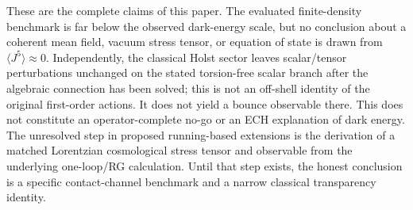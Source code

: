 \documentclass[aps,prd,twocolumn,superscriptaddress,preprintnumbers,nofootinbib,longbibliography,floatfix]{revtex4-2}
\begin{document}
These are the complete claims of this paper.  The evaluated finite-density
benchmark is far below the observed dark-energy scale, but no conclusion about
a coherent mean field, vacuum stress tensor, or equation of state is drawn
from $\langle J^5\rangle\approx0$.  Independently, the classical Holst sector
leaves scalar/tensor perturbations unchanged on the stated torsion-free scalar
branch after the algebraic connection has been solved; this is not an off-shell
identity of the original first-order actions.  It does not yield a bounce
observable there.  This does not constitute
an operator-complete no-go or an ECH explanation of dark energy.  The unresolved
step in proposed running-based extensions is the derivation of a matched
Lorentzian cosmological stress tensor and observable from the underlying
one-loop/RG calculation.  Until that step exists, the honest conclusion is a
specific contact-channel benchmark and a narrow classical transparency
identity.
\end{document}
